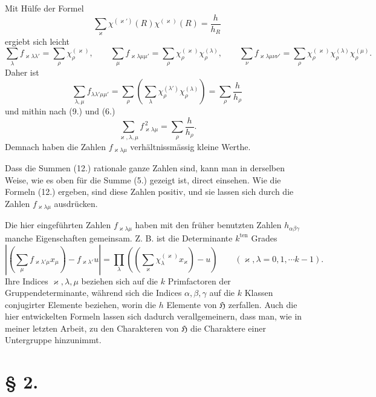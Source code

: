 \documentclass[11pt]{article}
\newcommand{\Hgr}{\mathfrak{H}}
\newcommand{\ten}{\mathrm{ten}}
\begin{document}
Mit Hülfe der Formel
\begin{equation*}\tag{11.}
\sum_\varkappa \chi^{(\varkappa')}(R)\chi^{(\varkappa)}(R)=\frac{h}{h_R}
\end{equation*}
ergiebt sich leicht
\begin{equation*}\tag{12.}
\sum_\lambda f_{\varkappa\lambda\lambda'}=\sum_\rho \chi_\rho^{(\varkappa)},\qquad
\sum_\mu f_{\varkappa\lambda\mu\mu'}=\sum_\rho \chi_\rho^{(\varkappa)}\chi_\rho^{(\lambda)},\qquad
\sum_\nu f_{\varkappa\lambda\mu\nu\nu'}=\sum_\rho \chi_\rho^{(\varkappa)}\chi_\rho^{(\lambda)}\chi_\rho^{(\mu)}.
\end{equation*}
Daher ist
\[
\sum_{\lambda,\mu}f_{\lambda\lambda'\mu\mu'}
=\sum_\rho\left(\sum_\lambda \chi_\rho^{(\lambda')}\chi_\rho^{(\lambda)}\right)
=\sum_\rho\frac{h}{h_\rho}
\]
und mithin nach (9.) und (6.)
\begin{equation*}\tag{13.}
\sum_{\varkappa,\lambda,\mu} f_{\varkappa\lambda\mu}^{\,2}
=\sum_\rho\frac{h}{h_\rho}.
\end{equation*}
Demnach haben die Zahlen $f_{\varkappa\lambda\mu}$ verhältnissmässig kleine Werthe.

Dass die Summen (12.) rationale ganze Zahlen sind, kann man in derselben Weise, wie es oben für die Summe (5.) gezeigt ist, direct einsehen. Wie die Formeln (12.) ergeben, sind diese Zahlen positiv, und sie lassen sich durch die Zahlen $f_{\varkappa\lambda\mu}$ ausdrücken.

Die hier eingeführten Zahlen $f_{\varkappa\lambda\mu}$ haben mit den früher benutzten Zahlen $h_{\alpha\beta\gamma}$ manche Eigenschaften gemeinsam. Z. B. ist die Determinante $k^{\ten}$ Grades
\begin{equation*}\tag{14.}
\left|\left(\sum_\mu f_{\varkappa\lambda'\mu}x_\mu\right)-f_{\varkappa\lambda'}u\right|
=\prod_\lambda\left(\left(\sum_\varkappa \chi_\lambda^{(\varkappa)}x_\varkappa\right)-u\right)
\qquad(\varkappa,\lambda=0,1,\cdots k-1).
\end{equation*}
Ihre Indices $\varkappa,\lambda,\mu$ beziehen sich auf die $k$ Primfactoren der Gruppendeterminante, während sich die Indices $\alpha,\beta,\gamma$ auf die $k$ Klassen conjugirter Elemente beziehen, worin die $h$ Elemente von $\Hgr$ zerfallen. Auch die hier entwickelten Formeln lassen sich dadurch verallgemeinern, dass man, wie in meiner letzten Arbeit, zu den Charakteren von $\Hgr$ die Charaktere einer Untergruppe hinzunimmt.

\section*{§ 2.}
\end{document}
